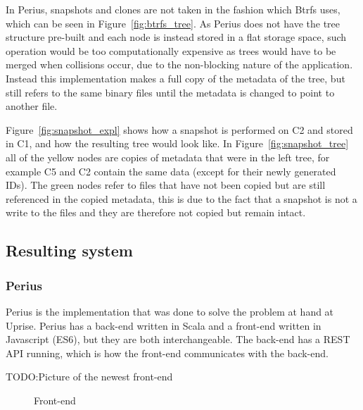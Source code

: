 \documentclass[a4paper,12pt]{article}
\newcommand{\fix}{\colorbox{yellow!30}{TODO:}}
\begin{document}
In Perius, snapshots and clones are not taken in the fashion which Btrfs uses, which can be seen in
Figure~\ref{fig:btrfs_tree}. As Perius does not have the tree structure pre-built and each node is
instead stored in a flat storage space, such operation would be too computationally expensive as
trees would have to be merged when collisions occur, due to the non-blocking nature of the
application. Instead this implementation makes a full copy of the metadata of the tree, but still
refers to the same binary files until the metadata is changed to point to another file.

Figure~\ref{fig:snapshot_expl} shows how a snapshot is performed on C2 and stored in C1, and how the
resulting tree would look like. In Figure~\ref{fig:snapshot_tree} all of the yellow nodes are copies
of metadata that were in the left tree, for example C5 and C2 contain the same data (except for
their newly generated IDs). The green nodes refer to files that have not been copied but are still
referenced in the copied metadata, this is due to the fact that a snapshot is not a write to the
files and they are therefore not copied but remain intact.

\subsection{Resulting system}
\subsubsection{Perius}
Perius is the implementation that was done to solve the problem at hand at Uprise. Perius has a
back-end written in Scala and a front-end written in Javascript (ES6), but they are both
interchangeable. The back-end has a REST API running, which is how the front-end communicates with
the back-end.

\fix Picture of the newest front-end
\begin{figure}[H] 
    \caption{Front-end~\cite{BTRFS}}
    \label{fig:frontend}
\end{figure}
\end{document}
